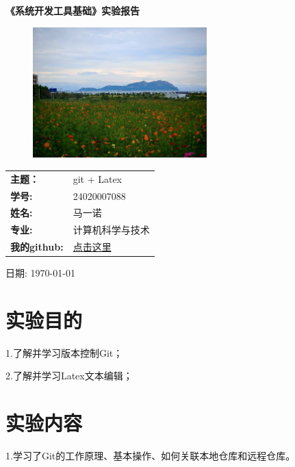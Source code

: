 \documentclass[a4paper]{article}
\begin{document}
 

\begin{titlepage}  
    \centering  
    \huge \textbf{《系统开发工具基础》实验报告}
    \vspace{5cm}  
    \begin{figure}[ht]
    \centering
    \includegraphics[width=0.6\textwidth]{images/face.jpg}
    \end{figure}
    
    \Large  
    \vspace{3cm} 
 
    \begin{tabular}{ll} 
        \textbf{主题：}& git + Latex\\
        \cline{2-2} 
        \textbf{学号:} & 24020007088 \\ 
       \cline{2-2} 
        \textbf{姓名:} & 马一诺 \\  
        \cline{2-2} 
        \textbf{专业:} & 计算机科学与技术 \\  
       \cline{2-2} 
       \textbf{我的github:} & \href{https://github.com/1-qaz-2-wsx/sys-dev-tools}{点击这里} \\
       \cline{2-2} 
    \end{tabular}  
    \vspace{2cm}  
 
    \Large 日期: \today  
    
\end{titlepage}  

\tableofcontents

\newpage
{}
\section{实验目的}  
1.了解并学习版本控制Git；

2.了解并学习Latex文本编辑；
\section{实验内容}
1.学习了Git的工作原理、基本操作、如何关联本地仓库和远程仓库。
\end{document}
